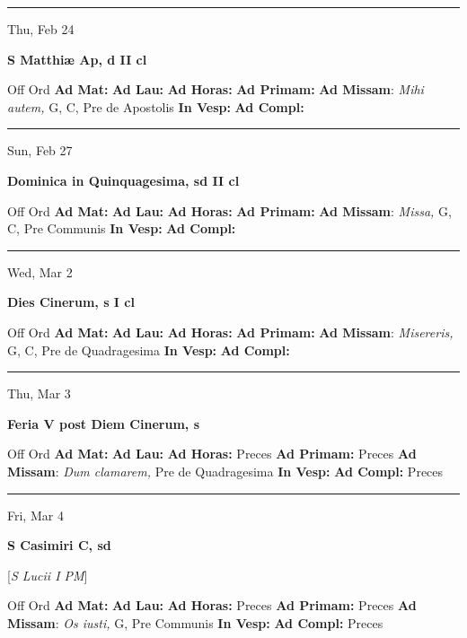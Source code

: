 \documentclass[letterpaper, 10pt]{article}
\begin{document}
\hrule
\begin{center}
Thu, Feb 24
\end{center}\textbf{ \large S Matthiæ Ap, \textnormal{\normalsize d II cl}}
\begin{justify}
Off Ord
\textbf{Ad Mat: }
\textbf{Ad Lau: }
\textbf{Ad Horas: }
\textbf{Ad Primam: }
\textbf{Ad Missam}: \textit{Mihi autem,} G, C, Pre de Apostolis
\textbf{In Vesp: }
\textbf{Ad Compl: }\end{justify}



\hrule
\begin{center}
Sun, Feb 27
\end{center}\textbf{ \large Dominica in Quinquagesima, \textnormal{\normalsize sd II cl}}
\begin{justify}
Off Ord
\textbf{Ad Mat: }
\textbf{Ad Lau: }
\textbf{Ad Horas: }
\textbf{Ad Primam: }
\textbf{Ad Missam}: \textit{Missa,} G, C, Pre Communis
\textbf{In Vesp: }
\textbf{Ad Compl: }\end{justify}



\hrule
\begin{center}
Wed, Mar 2
\end{center}\textbf{ \large Dies Cinerum, \textnormal{\normalsize s I cl}}
\begin{justify}
Off Ord
\textbf{Ad Mat: }
\textbf{Ad Lau: }
\textbf{Ad Horas: }
\textbf{Ad Primam: }
\textbf{Ad Missam}: \textit{Misereris,} G, C, Pre de Quadragesima
\textbf{In Vesp: }
\textbf{Ad Compl: }\end{justify}



\hrule
\begin{center}
Thu, Mar 3
\end{center}\textbf{ \large Feria V post Diem Cinerum, \textnormal{\normalsize s}}
\begin{justify}
Off Ord
\textbf{Ad Mat: }
\textbf{Ad Lau: }
\textbf{Ad Horas: }Preces
\textbf{Ad Primam: }Preces
\textbf{Ad Missam}: \textit{Dum clamarem,} Pre de Quadragesima
\textbf{In Vesp: }
\textbf{Ad Compl: }Preces\end{justify}



\hrule
\begin{center}
Fri, Mar 4
\end{center}\textbf{ \large S Casimiri C, \textnormal{\normalsize sd}}

[\textit{S Lucii I PM}]
\begin{justify}
Off Ord
\textbf{Ad Mat: }
\textbf{Ad Lau: }
\textbf{Ad Horas: }Preces
\textbf{Ad Primam: }Preces
\textbf{Ad Missam}: \textit{Os iusti,} G, Pre Communis
\textbf{In Vesp: }
\textbf{Ad Compl: }Preces\end{justify}
\end{document}
